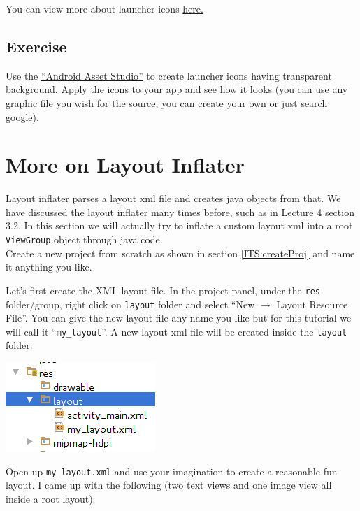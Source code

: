 You can view more about launcher icons \href{https://developer.android.com/guide/practices/ui_guidelines/icon_design_launcher.html}{here.}

\subsection{Exercise}
Use the \href{https://romannurik.github.io/AndroidAssetStudio/}{``Android Asset Studio''} to create launcher icons having transparent background. Apply the icons to your app and see how it looks (you can use any graphic file you wish for the source, you can create your own or just search google).

\section{More on Layout Inflater}
\label{ITS:moreOnInflater}
Layout inflater parses a layout xml file and creates java objects from that. We have discussed the layout inflater many times before, such as in Lecture 4 section 3.2. In this section we will actually try to inflate a custom layout xml into a root \texttt{ViewGroup} object through java code. \\

Create a new project from scratch as shown in section \ref{ITS:createProj} and name it anything you like.

Let's first create the XML layout file. In the project panel, under the \texttt{res} folder/group, right click on \texttt{layout} folder and select ``New $\rightarrow$ Layout Resource File''. You can give the new layout file any name you like but for this tutorial we will call it ``\texttt{my\_layout}''. A new layout xml file will be created inside the \texttt{layout} folder:

\begin{center}
	\includegraphics[scale=0.4]{chapters/ch06/images/30}
\end{center}

Open up \texttt{my\_layout.xml} and use your imagination to create a reasonable fun layout. I came up with the following (two text views and one image view all inside a root layout):

